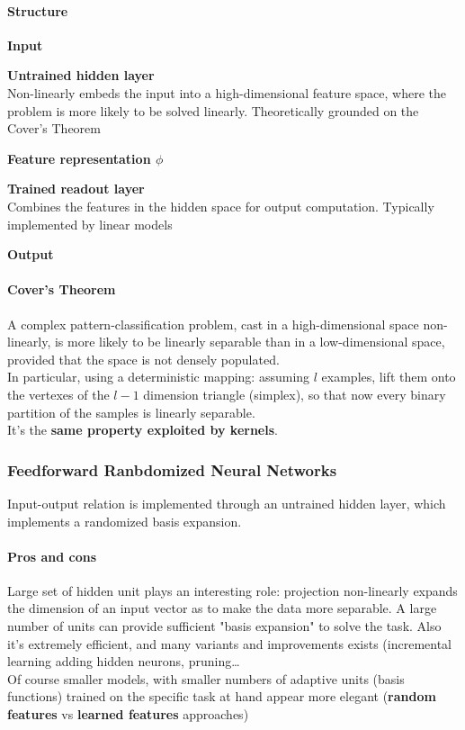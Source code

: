 \documentclass[10pt]{report}
\begin{document}
\paragraph{Structure}\begin{list}{}{}
	\item \textbf{Input}
	\item \textbf{Untrained hidden layer}\\
	Non-linearly embeds the input into a high-dimensional feature space, where the problem is more likely to be solved linearly. Theoretically grounded on the Cover's Theorem
	\item \textbf{Feature representation $\phi$}
	\item \textbf{Trained readout layer}\\
	Combines the features in the hidden space for output computation. Typically implemented by linear models
	\item \textbf{Output}
\end{list}
\paragraph{Cover's Theorem} A complex pattern-classification problem, cast in a high-dimensional space non-linearly, is more likely to be linearly separable than in a low-dimensional space, provided that the space is not densely populated.\\
In particular, using a deterministic mapping: assuming $l$ examples, lift them onto the vertexes of the $l-1$ dimension triangle (simplex), so that now every binary partition of the samples is linearly separable.\\
It's the \textbf{same property exploited by kernels}.
\subsubsection{Feedforward Ranbdomized Neural Networks} Input-output relation is implemented through an untrained hidden layer, which implements a randomized basis expansion.
\paragraph{Pros and cons} Large set of hidden unit plays an interesting role: projection non-linearly expands the dimension of an input vector as to make the data more separable. A large number of units can provide sufficient "basis expansion" to solve the task. Also it's extremely efficient, and many variants and improvements exists (incremental learning adding hidden neurons, pruning\ldots\\
Of course smaller models, with smaller numbers of adaptive units (basis functions) trained on the specific task at hand appear more elegant (\textbf{random features} vs \textbf{learned features} approaches)
\end{document}
